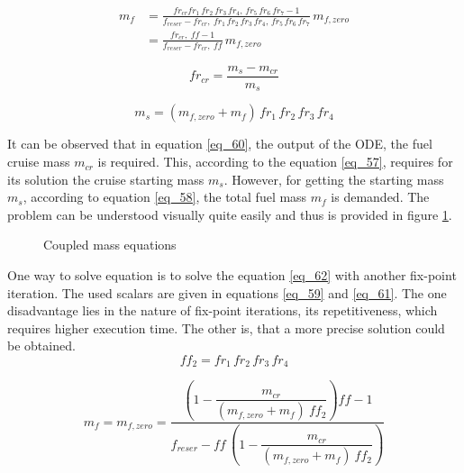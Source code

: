 \begin{equation}
    \label{eq_60}
    \begin{aligned}
        m_f &= \frac{fr_{cr} fr_1 \, fr_2\,fr_3 \, fr_4 ,\, fr_5\, fr_6\, fr_7 -1
        }{f_{reser} - fr_{cr} ,\ fr_1 \, fr_2\,fr_3 \, fr_4 ,\, fr_5\, fr_6\, fr_7 }
        \, m_{f,zero}\\
        &= \frac{fr_{cr} ,\ ff - 1   }{f_{reser}- fr_{cr} ,\ ff  } \, m_{f,zero}
    \end{aligned}
\end{equation}

\begin{equation*}
    fr_{cr} =  \frac{m_s - m_{cr}}{m_s}
\end{equation*}

\begin{equation*}
    m_s = (m_{f,zero} + m_{f})  \, fr_1 \, fr_2\,fr_3 \, fr_4
\end{equation*}


It can be observed that in equation \eqref{eq_60}, the 
output of the ODE, the fuel cruise mass $m_{cr}$ is required. 
This, according to the equation \eqref{eq_57}, requires for its solution 
the cruise starting mass $m_s$. However, for 
getting the starting mass $m_s$, 
according to equation \eqref{eq_58}, the total fuel mass 
$m_f$ is demanded. The problem can be understood visually 
quite easily and thus is provided in figure \ref{fig_6_Coupled}.

\begin{figure}[!h]
        \centering
        \def\svgwidth{0.4\textwidth}
        
        \caption{Coupled mass equations}
        \label{fig_6_Coupled}
\end{figure}

\FloatBarrier
One way to solve equation is to solve the equation \eqref{eq_62}
with another fix-point iteration. The used 
scalars are given in equations \eqref{eq_59} and \eqref{eq_61}.
The one disadvantage lies 
in the nature of fix-point iterations, its repetitiveness, 
which requires higher execution time. 
The other is, that a more precise solution could 
be obtained. 
\begin{equation}
    \label{eq_61}
    ff_2 =  fr_1 \, fr_2\,fr_3 \, fr_4
\end{equation}

\begin{equation}
    \label{eq_62}
    m_f = m_{f,zero} = \dfrac{\left(1- \dfrac{m_{cr}}{(m_{f,zero} + m_f) \ ff_2}
    \right)ff -1}{f_{reser} - ff \, \left(  1 -\dfrac{m_{cr}}{(m_{f,zero} + m_f) \ ff_2}\right)}
\end{equation}

